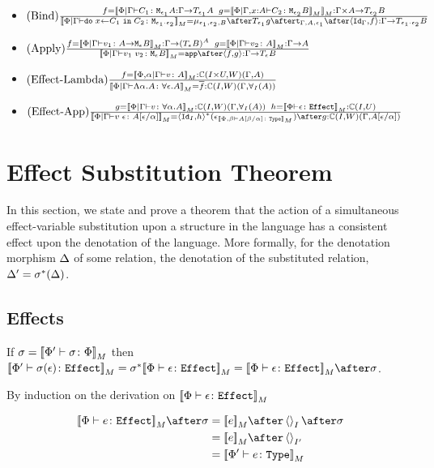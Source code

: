 \documentclass{report}
\newcommand{\allI}[0]{\forall_I}
\newcommand\type[0]{\texttt{Type}}
\newcommand\effect[0]{\texttt{Effect}}
\newcommand\ciw[0]{\C(I, W)}
\newcommand\ciu[0]{\C(I, U)}
\newcommand\ciuw[0]{\C(I\times U, W)}
\renewcommand\star[0]{^*}
\renewcommand\bar[1]{\overline{#1}}
\begin{document}
\begin{itemize}
    \item $\treerule{Bind}{f = \deno{\etyperelation{\P}{\G}{C_1}{\M{\e_1}{A}} : \G \rightarrow \T{\e_1}{A}\s\s g = \deno{\etyperelation{\P}{\gax}{C_2}{\M{\e_2}{B}}}}: \G \times A \rightarrow \T{\e_2}{B}}{\deno{\etyperelation{\P}{\G}{\doin{x}{C_1}{C_2}}{\M{\e_1 \dot \e_2}}} = \bind{\e_1}{\e_2}{B} \after \T{\e_1}{g} \after \tstrength{\G}{A}{\e_1} \after \pr{\idg}{f}: \G \rightarrow \T{\e_1 \dot \e_2}{B}}$ 
   
    \item $\treerule{Apply}{f = \deno{\gpetyperelation{v_1}{\lamtype{A}{\e}B}}: \G \rightarrow (\teb)^{A} \s\s g=\deno{\gpetyperelation{v_2}{A}}: \G \rightarrow A}{\deno{\gpetyperelation{\apply{v_1}{v_2}}{\meb}}= \app\after\pr{f}{g}: \G \rightarrow \teb }$
    \item $\treerule{Effect-Lambda}{f = \deno{\etyperelation{\P,\a}{\G}{v}{A}}: \ciuw(\G, A)}{\deno{\gpetyperelation{\elam{\a}{A}}{\all{\e}{A}}} = \bar{f}: \ciw(\G, \allI(A))}$
    \item $\treerule{Effect-App}{g=\deno{\gpetyperelation{v}{\all{\a}{A}}}: \ciw(\G, \allI(A))\s\s h = \deno{\typerelation{\P}{\e}{\effect}}: \ciu}{\deno{\gpetyperelation{\eapp{v}{\e}}{A\ssub{\a}{\e}}} = \pr{\Id{I}}{h}\star(\e_{\deno{\typerelation{\P,\b}{A\ssub{\a}{\b}}{\type}}})\after g: \ciw(\G, A\ssub{\a}{\e})}$
\end{itemize}

\chapter{Effect Substitution Theorem}
In this section, we state and prove a theorem that the action of a simultaneous effect-variable substitution upon a structure in the language has a consistent effect upon the denotation of the language. More formally, for the denotation morphism $\Delta$ of some relation, the denotation of the substituted relation, $\D' = \si\star(\D)$.
\section{Effects}
If $\sigma = {\bf [\![}\Phi' \vdash \sigma \colon \Phi{\bf ]\!]}_M$ then $\deno{\typerelation{\P'}{\si(\e)}{\effect}} = \si\star\deno{\typerelation{\P}{\e}{\effect}} = \deno{\typerelation{\P}{\e}{\effect}}\after\si$.

\proof
By induction on the derivation on $\deno{\typerelation{\P}{\e}{\effect}}$

\begin{align}
    \deno{\typerelation{\P}{e}{\effect}}\after\si & = \deno{e}\after\term{I}\after\si \\
    & = \deno{e}\after\term{I'} \\
    & = \deno{\typerelation{\P'}{e}{\type}}\\
\end{align}
\end{document}

